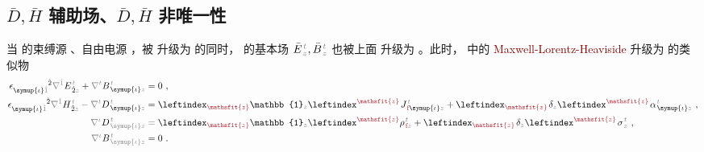 \clearpage
\vspace*{-8.0em}

\subsection{$\bar{D},\bar{H}$ 辅助场、$\bar{D},\bar{H}$ 非唯一性}\label{ssec:DH-boundary}

当  的束缚源 、自由电源 ，被  升级为  的同时， 的\textcolor{NavyBlue}{基本场} $\bar{E}^{\;\!\mathcolor{gray}{t}}_{\;\!\mathcolor{gray}{z}}, \bar{B}^{\;\!\mathcolor{gray}{t}}_{\;\!\mathcolor{gray}{z}}$ 也被上面  升级为 。此时， 中的 \textcolor{Maroon}{Maxwell-Lorentz-Heaviside}  升级为  的类似物
\begin{subequations} \label{eq:curl-EH}
\begin{align}
	\epsilon^{\hphantom{\symup{\iota}\hat{1}}\hat{2}}_{\symup{\iota}\mathcolor{gray}{\hat{1}}} \mathcolor{gray}{\nabla^{\hat{1}}} E^{\;\!\mathcolor{gray}{t}}_{\;\! \hat{2}\mathcolor{gray}{z}} + \mathcolor{gray}{\nabla^t} B^{\;\!\mathcolor{gray}{t}}_{\;\! \symup{\iota}\mathcolor{gray}{z}} &= 0~, \label{eq:curl-E'duplicate} \\
	\epsilon^{\hphantom{\symup{\iota}\hat{1}}\hat{2}}_{\symup{\iota}\mathcolor{gray}{\hat{1}}} \mathcolor{gray}{\nabla^{\hat{1}}} H^{\;\!\mathcolor{gray}{t}}_{\;\! \hat{2}\mathcolor{gray}{z}} - \mathcolor{gray}{\nabla^t} D^{\;\!\mathcolor{gray}{t}}_{\;\! \symup{\iota}\mathcolor{gray}{z}} &= \leftindex_{\textcolor{Maroon}{\mathsfit{z}}} {\mathbb{1}}_{\mathcolor{gray}{z}} \leftindex^{\textcolor{Maroon}{\mathsfit{z}}} \;\! J^{\;\!\mathcolor{gray}{t}}_{\;\!\textcolor{Maroon}{\text{f}} \symup{\iota}\mathcolor{gray}{z}} + \leftindex_{\textcolor{Maroon}{\mathsfit{z}}} \;\! \delta_{\mathcolor{gray}{z}} \leftindex^{\textcolor{Maroon}{\mathsfit{z}}} \;\!
	{\alpha}^{\;\!\mathcolor{gray}{t}}_{\;\! \symup{\iota}\mathcolor{gray}{z}} ~, \label{eq:curl-H'} \\
	\mathcolor{gray}{\nabla^\iota} D^{\;\!\mathcolor{gray}{t}}_{\;\! \mathcolor{gray}{\symup{\iota}} \mathcolor{gray}{z}} &= \leftindex_{\textcolor{Maroon}{\mathsfit{z}}} {\mathbb{1}}_{\mathcolor{gray}{z}} \leftindex^{\textcolor{Maroon}{\mathsfit{z}}} {\rho}^{\;\!\mathcolor{gray}{t}}_{\;\!\textcolor{Maroon}{\text{f}}\mathcolor{gray}{z}} + \leftindex_{\textcolor{Maroon}{\mathsfit{z}}} \;\! \delta_{\mathcolor{gray}{z}} \leftindex^{\textcolor{Maroon}{\mathsfit{z}}} \;\! {\sigma}^{\;\!\mathcolor{gray}{t}}_{\;\! \mathcolor{gray}{z}}~, \label{eq:div-D'} \\
	\mathcolor{gray}{\nabla^\iota} B^{\;\!\mathcolor{gray}{t}}_{\;\! \mathcolor{gray}{\symup{\iota}} \mathcolor{gray}{z}} &= 0~. \label{eq:div-B'duplicate}
\end{align}
\end{subequations}

